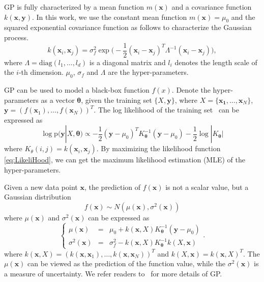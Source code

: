 GP is fully characterized by a mean function $m(\mathbf{x})$ and a covariance
function $k(\mathbf{x}, \mathbf{y})$. In this work, we use the constant mean function
$m(\mathbf{x}) = \mu_0$ and the squared exponential covariance function as follows to characterize the Gaussian process.
\begin{equation}
    \label{eq:GaussianCovarianceFunction}
    k(\mathbf{x}_i, \mathbf{x}_j) = \sigma_f^2 \exp\Big(-\frac{1}{2}(\mathbf{x}_i - \mathbf{x}_j)^T\Lambda^{-1}(\mathbf{x}_i - \mathbf{x}_j)\Big),
\end{equation}
where $\Lambda = \mathrm{diag}(l_1, \dots, l_d)$ is a diagonal matrix and $l_i$ denotes the length scale of the $i$-th dimension. $\mu_0$, $\sigma_f$ and $\Lambda$ are the hyper-parameters.

GP can be used to model a black-box function $f(x)$. Denote the hyper-parameters as a vector $\mathbf{\theta}$, given the training set
$\{X, \mathbf{y}\}$, where $X = \{\mathbf{x_1}, \dots, \mathbf{x}_N\}$, $\mathbf{y} =
(f(\mathbf{x}_1), \dots, f(\mathbf{x}_N))^T$. The log likelihood of the training
set~\cite{GPML} can be expressed as
\begin{equation}
    \log \mathrm{p}(\mathbf{y} | X, \mathbf{\theta}) \propto -\frac{1}{2}(\mathbf{y} - \mu_0)^T K_{\mathbf{\theta}}^{-1}(\mathbf{y} - \mu_0) - \frac{1}{2} \log |K_{\mathbf{\theta}}|
    \label{eq:LikeliHood}
\end{equation}
where $K_\theta({i, j}) = k(\mathbf{x}_i, \mathbf{x}_j)$. By maximizing the likelihood
function \ref{eq:LikeliHood}, we can get the maximum likelihood estimation
(MLE) of the hyper-parameters.

Given a new data point $\mathbf{x}$, the prediction of $f(\mathbf{x})$ is
not a scalar value, but a Gaussian distribution 
\begin{equation}
f(\mathbf{x}) \sim N(\mu(\mathbf{x}),
\sigma^2(\mathbf{x}))
\label{eq:GPRPred}
\end{equation}
where $\mu(\mathbf{x})$ and $\sigma^2(\mathbf{x})$ can be expressed as
\begin{equation}
    \left\{
        \begin{array}{lll}
            \mu(\mathbf{x}) &=& \mu_0 + k(\mathbf{x},X)K_{\mathbf{\theta}}^{-1}(\mathbf{y} - \mu_0) \\
            \sigma^2(\mathbf{x}) &=& \sigma_f^2 - k(\mathbf{x}, X)K_{\mathbf{\theta}}^{-1}k(X, \mathbf{x})
        \end{array}
    \right..
    \label{eq:GPRPredEqNoisy}
\end{equation}
where $k(\mathbf{x}, X) = (k(\mathbf{x}, \mathbf{x}_1), \dots, k(\mathbf{x}, \mathbf{x}_N))^T$ and
$k(X, \mathbf{x}) = k(\mathbf{x}, X)^T$.  The $\mu(\mathbf{x})$ can be viewed as the
prediction of the function value, while the $\sigma^2(\mathbf{x})$ is a measure of
uncertainty. We refer readers
to~\cite{GPML} for more details of GP.

